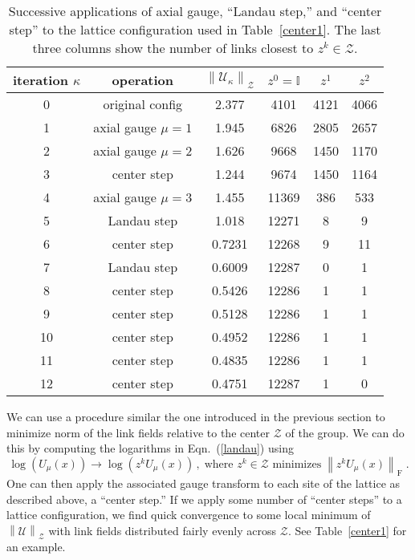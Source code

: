 \documentclass[preprint,aps,prd]{revtex4-2}
\newcommand{\be}{\begin{equation}}
\newcommand{\eq}{\end{equation}}
\newcommand{\zentrum}{\mathcal{Z}}       %
\newcommand{\config}{\mathcal{U}}
\newcommand\fnorm[1]{\left\lVert #1 \right\rVert_\mathrm{F}}
\begin{document}
\begin{table}
  \caption{Successive applications of axial gauge,
    ``Landau step,'' and ``center step'' to the lattice configuration
    used in Table~\ref{center1}.
    The last three columns show the number of links closest
    to $z^k \in \zentrum$.
    \label{center4}}
  \begin{tabular}{c|c|c|ccc}
    iteration $\kappa$ & operation & $\left\lVert \config_\kappa \right\rVert_\zentrum$
     & $z^0=\mathbb{I}$ & $z^1$ & $z^2$ \\
    \hline
    0 & original config    & 2.377  & 4101 & 4121 & 4066\\
    1 & axial gauge $\mu=1$& 1.945  & 6826 & 2805 & 2657\\
    2 & axial gauge $\mu=2$& 1.626  & 9668 & 1450 & 1170\\
    3 & center step        & 1.244  & 9674 & 1450 & 1164\\
    4 & axial gauge $\mu=3$& 1.455  & 11369 & 386 & 533\\
    5 & Landau step        & 1.018  & 12271 &   8 &   9\\
    6 & center step        & 0.7231 & 12268 &   9 &  11\\
    7 & Landau step        & 0.6009 & 12287 &   0 &   1\\
    8 & center step        & 0.5426 & 12286 &   1 &   1\\
    9 & center step        & 0.5128 & 12286 &   1 &   1\\
    10 & center step       & 0.4952 & 12286 &   1 &   1\\
    11 & center step       & 0.4835 & 12286 &   1 &   1\\
    12 & center step       & 0.4751 & 12287 &   1 &   0\\
  \end{tabular}
  \end{table}

We can use a procedure similar the one introduced
in the previous section to minimize norm of the link fields
relative to the center $\zentrum$ of the group.
We can do this by computing the logarithms in Eqn.~(\ref{landau})
using
\be
\log\left(U_\mu(x)\right) \to \log\left(z^k U_\mu(x)\right)
\, , \;\mbox{
  where $z^k\in\zentrum$ minimizes}\; \fnorm{z^k U_\mu(x)} \;.
\eq
One can then apply the associated gauge transform to each site of
the lattice as described above, a ``center step.''
If we apply some number of ``center steps'' to a lattice
configuration, we find quick convergence to some local
minimum of $\left\lVert \config \right\rVert_\zentrum$ with
link fields distributed fairly evenly across $\zentrum$.
See Table~\ref{center1} for an example.
\end{document}
